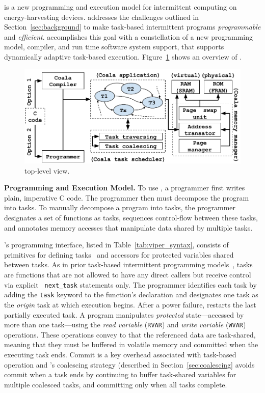 \sys is a new programming and execution model for intermittent computing on
energy-harvesting devices. \sys addresses the challenges outlined in
Section~\ref{sec:background} to make task-based intermittent programs {\em
programmable} and {\em efficient}. \sys accomplishes this goal with a
constellation of a new programming model, compiler, and run time software
system support, that supports dynamically adaptive task-based execution.
Figure~\ref{fig:system_overview} shows an overview of \sys.

\begin{figure}
	\centering
	\includegraphics[width=\columnwidth]{figures/viper_block_diagram.pdf}
	\caption{\sys top-level view.}
	\label{fig:system_overview}
\end{figure}

\textbf{\sys Programming and Execution Model.} 
To use \sys, a programmer first writes plain, imperative C code. The programmer
then must decompose the program into tasks. To manually decompose a program
into tasks, the programmer designates a set of functions as tasks, sequences
control-flow between these tasks, and annotates memory accesses that manipulate
data shared by multiple tasks. 

\sys's programming interface, listed in Table~\ref{tab:viper_syntax}, consists
of primitives for defining tasks~\cite{chain,alpaca} and accessors for
protected variables shared between tasks. As in prior task-based intermittent
programming models~\cite{chain,alpaca}, tasks are functions that are not
allowed to have any direct callers but receive control via explicit {\tt
next\_task} statements only.  The programmer identifies each task
by adding the {\tt task} keyword to the function's declaration and designates
one task as the {\em origin} task at which execution begins. After a power
failure, \sys restarts the last partially executed task.
%
A \sys program manipulates {\em protected} state---accessed by more than one
task---using the \emph{read variable} ({\tt RVAR}) and \emph{write variable}
({\tt WVAR}) operations. These operations convey to \sys that
the referenced data are task-shared, meaning that they must be buffered in
volatile memory and committed when the executing task ends.
%
Commit is a key overhead associated with task-based operation and \sys's
coalescing strategy (described in Section~\ref{sec:coalescing} avoids commit
when a task ends by continuing to buffer task-shared variables for multiple
coalesced tasks, and committing only when all tasks complete.


